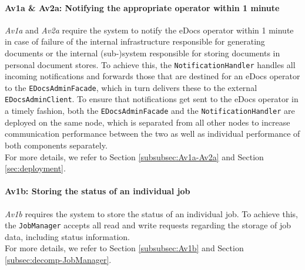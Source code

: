 \documentclass[a4paper,10pt]{article}
\begin{document}
\paragraph{Av1a \& Av2a: Notifying the appropriate operator within 1 minute}
\textit{Av1a} and \textit{Av2a} require the system to notify the eDocs operator within 1 minute in case of failure of the internal infrastructure responsible for generating documents or the internal (sub-)system responsible for storing documents in personal document stores. To achieve this, the \texttt{NotificationHandler} handles all incoming notifications and forwards those that are destined for an eDocs operator to the \texttt{EDocsAdminFacade}, which in turn delivers these to the external \texttt{EDocsAdminClient}. To ensure that notifications get sent to the eDocs operator in a timely fashion, both the \texttt{EDocsAdminFacade} and the \texttt{NotificationHandler} are deployed on the same node, which is separated from all other nodes to increase communication performance between the two as well as individual performance of both components separately.\\
For more details, we refer to Section \ref{subsubsec:Av1a-Av2a} and Section \ref{sec:deployment}.

\paragraph{Av1b: Storing the status of an individual job}
\textit{Av1b} requires the system to store the status of an individual job. To achieve this, the \texttt{JobManager} accepts all read and write requests regarding the storage of job data, including status information.\\
For more details, we refer to Section \ref{subsubsec:Av1b} and Section \ref{subsec:decomp-JobManager}.
\end{document}
